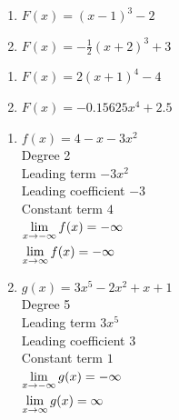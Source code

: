\begin{multicols}{2}
\begin{enumerate}
\setcounter{enumi}{\value{HW}}

\item  $F(x) = (x-1)^3-2$ 
\item $F(x) = -\frac{1}{2} (x+2)^3+3$

\setcounter{HW}{\value{enumi}}
\end{enumerate}
\end{multicols}

\begin{multicols}{2}
\begin{enumerate}
\setcounter{enumi}{\value{HW}}

\item  $F(x) = 2(x+1)^4-4$ \
\item $F(x) = -0.15625x^4+2.5$

\setcounter{HW}{\value{enumi}}
\end{enumerate}
\end{multicols}


\begin{multicols}{2}
\begin{enumerate}
\setcounter{enumi}{\value{HW}}
\item $f(x) = 4-x-3x^2$ \\
Degree 2 \\
Leading term $-3x^{2}$\\
Leading coefficient $-3$\\
Constant term $4$\\
$\displaystyle{\lim_{x \rightarrow - \infty} f(x)  = -\infty}$ \\
$\displaystyle{\lim_{x \rightarrow  \infty} f(x)  = -\infty}$ \\


\item  $g(x) = 3x^5 - 2x^2 + x + 1$ \\
Degree 5 \\
Leading term $3x^5$\\
Leading coefficient $3$\\
Constant term $1$\\
$\displaystyle{\lim_{x \rightarrow - \infty} g(x)  = -\infty}$ \\
$\displaystyle{\lim_{x \rightarrow \infty} g(x)  = \infty}$ \\



\setcounter{HW}{\value{enumi}}
\end{enumerate}
\end{multicols}

